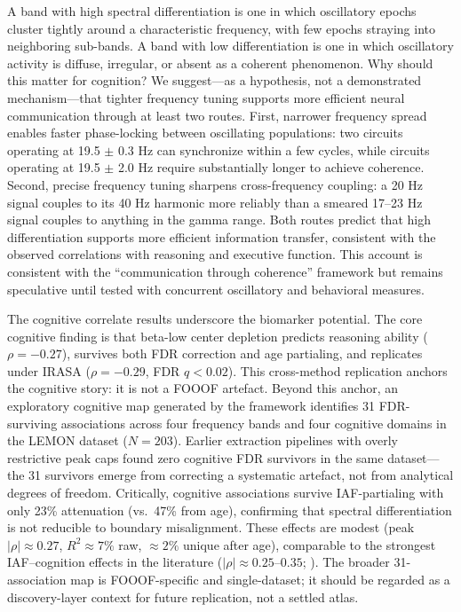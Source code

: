 A band with high spectral differentiation is one in which oscillatory epochs cluster tightly around a characteristic frequency, with few epochs straying into neighboring sub-bands. A band with low differentiation is one in which oscillatory activity is diffuse, irregular, or absent as a coherent phenomenon. Why should this matter for cognition? We suggest---as a hypothesis, not a demonstrated mechanism---that tighter frequency tuning supports more efficient neural communication through at least two routes. First, narrower frequency spread enables faster phase-locking between oscillating populations: two circuits operating at 19.5 $\pm$ 0.3 Hz can synchronize within a few cycles, while circuits operating at 19.5 $\pm$ 2.0 Hz require substantially longer to achieve coherence. Second, precise frequency tuning sharpens cross-frequency coupling: a 20 Hz signal couples to its 40 Hz harmonic more reliably than a smeared 17--23 Hz signal couples to anything in the gamma range. Both routes predict that high differentiation supports more efficient information transfer, consistent with the observed correlations with reasoning and executive function. This account is consistent with the ``communication through coherence'' framework \parencite{buzsaki2004neuronal} but remains speculative until tested with concurrent oscillatory and behavioral measures.

The cognitive correlate results underscore the biomarker potential. The core cognitive finding is that beta-low center depletion predicts reasoning ability ($\rho = -0.27$), survives both FDR correction and age partialing, and replicates under IRASA ($\rho = -0.29$, FDR $q < 0.02$). This cross-method replication anchors the cognitive story: it is not a FOOOF artefact. Beyond this anchor, an exploratory cognitive map generated by the framework identifies 31 FDR-surviving associations across four frequency bands and four cognitive domains in the LEMON dataset ($N = 203$). Earlier extraction pipelines with overly restrictive peak caps found zero cognitive FDR survivors in the same dataset---the 31 survivors emerge from correcting a systematic artefact, not from analytical degrees of freedom. Critically, cognitive associations survive IAF-partialing with only 23\% attenuation (vs.\ 47\% from age), confirming that spectral differentiation is not reducible to boundary misalignment. These effects are modest (peak $|\rho| \approx 0.27$, $R^2 \approx 7\%$ raw, $\approx 2\%$ unique after age), comparable to the strongest IAF--cognition effects in the literature ($|\rho| \approx 0.25$--$0.35$; \textcite{grandy2013iaf}). The broader 31-association map is FOOOF-specific and single-dataset; it should be regarded as a discovery-layer context for future replication, not a settled atlas.

